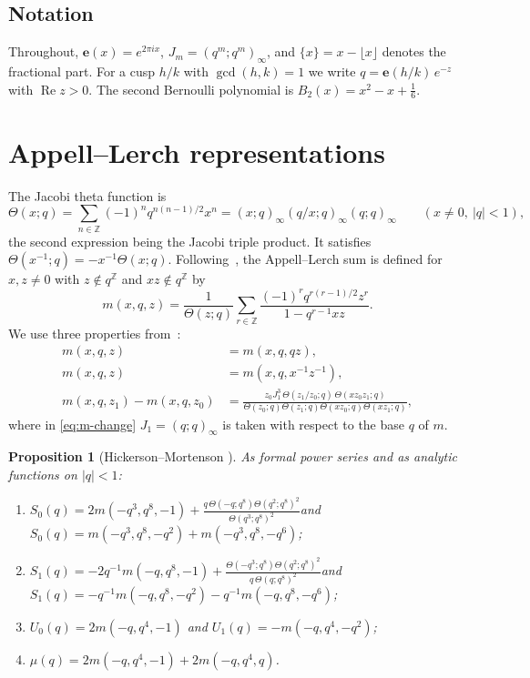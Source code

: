 \documentclass[11pt]{amsart}
\newtheorem{proposition}[theorem]{Proposition}
\theoremstyle{definition}
\theoremstyle{remark}
\numberwithin{equation}{section}
\newcommand{\e}{\mathbf{e}}
\newcommand{\Z}{\mathbb{Z}}
\newcommand{\re}{\operatorname{Re}}
\newcommand{\fr}[1]{\{#1\}}
\begin{document}
\subsection*{Notation}
Throughout, $\e(x)=e^{2\pi i x}$, $J_m=(q^m;q^m)_\infty$, and $\fr{x}=x-\lfloor x\rfloor$ denotes the fractional part.
For a cusp $h/k$ with $\gcd(h,k)=1$ we write $q=\e(h/k)\,e^{-z}$ with $\re z>0$.
The second Bernoulli polynomial is $B_2(x)=x^2-x+\frac16$.

\section{Appell--Lerch representations}\label{sec:AL}

The Jacobi theta function is
\[
\Theta(x;q)=\sum_{n\in\Z}(-1)^nq^{n(n-1)/2}x^n=(x;q)_\infty(q/x;q)_\infty(q;q)_\infty \qquad (x\neq0,\ |q|<1),
\]
the second expression being the Jacobi triple product.
It satisfies $\Theta(x^{-1};q)=-x^{-1}\Theta(x;q)$.
Following~\cite{HM}, the Appell--Lerch sum is defined for $x,z\neq0$ with $z\notin q^{\Z}$ and $xz\notin q^{\Z}$ by
\begin{equation}\label{eq:m}
m(x,q,z)=\frac{1}{\Theta(z;q)}\sum_{r\in\Z}\frac{(-1)^rq^{r(r-1)/2}z^r}{1-q^{r-1}xz}.
\end{equation}
We use three properties from~\cite[Prop.~2.1, Cor.~2.4, Thm.~2.3]{HM}:
\begin{align}
m(x,q,z)&=m(x,q,qz), \label{eq:m-shift}\\
m(x,q,z)&=m(x,q,x^{-1}z^{-1}), \label{eq:m-sym}\\
m(x,q,z_1)-m(x,q,z_0)&=\frac{z_0J_1^3\,\Theta(z_1/z_0;q)\,\Theta(xz_0z_1;q)}{\Theta(z_0;q)\Theta(z_1;q)\Theta(xz_0;q)\Theta(xz_1;q)}, \label{eq:m-change}
\end{align}
where in \eqref{eq:m-change} $J_1=(q;q)_\infty$ is taken with respect to the base $q$ of $m$.

\begin{proposition}[Hickerson--Mortenson {\cite[\S4]{HM}}]\label{prop:HM}
As formal power series and as analytic functions on $|q|<1$:
\begin{enumerate}
\item $\displaystyle S_0(q)=2m(-q^3,q^8,-1)+\frac{q\,\Theta(-q;q^8)\Theta(q^2;q^8)^2}{\Theta(q^3;q^8)^2}$\newline and $S_0(q)=m(-q^3,q^8,-q^2)+m(-q^3,q^8,-q^6)$;
\item $\displaystyle S_1(q)=-2q^{-1}m(-q,q^8,-1)+\frac{\Theta(-q^3;q^8)\Theta(q^2;q^8)^2}{q\,\Theta(q;q^8)^2}$\newline and $S_1(q)=-q^{-1}m(-q,q^8,-q^2)-q^{-1}m(-q,q^8,-q^6)$;
\item $U_0(q)=2m(-q,q^4,-1)$ and $U_1(q)=-m(-q,q^4,-q^2)$;
\item $\mu(q)=2m(-q,q^4,-1)+2m(-q,q^4,q)$.
\end{enumerate}
\end{proposition}
\end{document}
